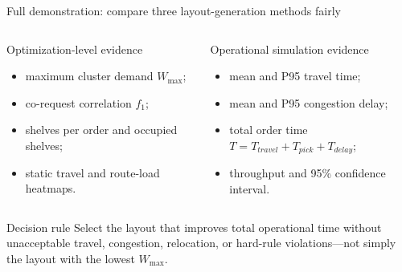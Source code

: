 \documentclass[aspectratio=169,10pt]{beamer}
\begin{document}
\begin{frame}{Full demonstration: compare three layout-generation methods fairly}
  \centering
  \vspace{0.35cm}
  \begin{columns}[T,onlytextwidth]
    \begin{block}{Optimization-level evidence}
      \scriptsize
      \begin{itemize}
        \item maximum cluster demand $W_{\max}$;
        \item co-request correlation $f_1$;
        \item shelves per order and occupied shelves;
        \item static travel and route-load heatmaps.
      \end{itemize}
    \end{block}
    \begin{block}{Operational simulation evidence}
      \scriptsize
      \begin{itemize}
        \item mean and P95 travel time;
        \item mean and P95 congestion delay;
        \item total order time $T= T_{travel}+T_{pick}+T_{delay}$;
        \item throughput and 95\% confidence interval.
      \end{itemize}
    \end{block}
  \end{columns}
  \begin{alertblock}{Decision rule}
    \centering\scriptsize Select the layout that improves total operational
    time without unacceptable travel, congestion, relocation, or hard-rule
    violations---not simply the layout with the lowest $W_{\max}$.
  \end{alertblock}
\end{frame}
\end{document}

